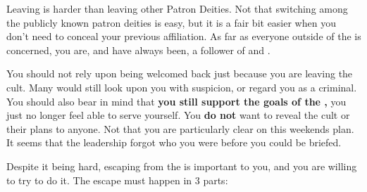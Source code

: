 \documentclass[green]{GL2020}
\begin{document}
\name{\gEscapingFoG{}}

Leaving \cChupGod{} is harder than leaving other Patron Deities. Not that switching among the publicly known patron deities is easy, but it is a fair bit easier when you don’t need to conceal your previous affiliation. As far as everyone outside of the \pGoaties{} is concerned, you are, and have always been, a follower of \cEbb{} and \cFlow{}.

You should not rely upon being welcomed back just because you are leaving the cult. Many would still look upon you with suspicion, or regard you as a criminal. You should also bear in mind that \textbf{you still support the goals of the \pGoaties{},} you just no longer feel able to serve yourself. You \textbf{do not} want to reveal the cult or their plans to anyone. Not that you are particularly clear on this weekends plan. It seems that the leadership forgot who you were before you could be briefed.

Despite it being hard, escaping from the \pGoaties{} is important to you, and you are willing to try to do it. The escape must happen in 3 parts:
\end{document}
